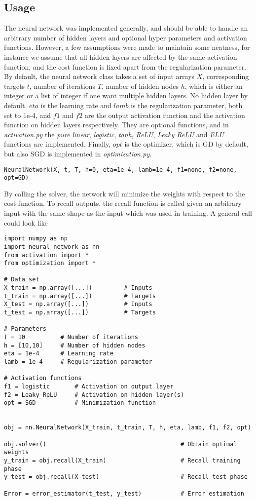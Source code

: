 \subsection{Usage}
The neural network was implemented generally, and should be able to handle an arbitrary number of hidden layers and optional hyper parameters and activation functions. However, a few assumptions were made to maintain some neatness, for instance we assume that all hidden layers are affected by the same activation function, and the cost function is fixed apart from the regularization parameter. By default, the neural network class takes a set of input arrays $X$, corresponding targets $t$, number of iterations $T$, number of hidden nodes $h$, which is either an integer or a list of integer if one want multiple hidden layers. No hidden layer by default. $eta$ is the learning rate and $lamb$ is the regularization parameter, both set to 1e-4, and $f1$ and $f2$ are the output activation function and the activation function on hidden layers respectively. They are optional functions, and in \textit{activation.py} the \textit{pure linear}, \textit{logistic}, \textit{tanh}, \textit{ReLU}, \textit{Leaky ReLU} and \textit{ELU} functions are implemented. Finally, $opt$ is the optimizer, which is GD by default, but also SGD is implemented in \textit{optimization.py}.

\lstset{basicstyle=\scriptsize}
\begin{lstlisting}
NeuralNetwork(X, t, T, h=0, eta=1e-4, lamb=1e-4, f1=none, f2=none, opt=GD)
\end{lstlisting}
By calling the solver, the network will minimize the weights with respect to the cost function. To recall outputs, the recall function is called given an arbitrary input with the same shape as the input which was used in training. A general call could look like

\lstset{basicstyle=\scriptsize}
\begin{lstlisting}
import numpy as np
import neural_network as nn
from activation import *
from optimization import *

# Data set
X_train = np.array([...])         # Inputs
t_train = np.array([...])         # Targets
X_test = np.array([...])          # Inputs
t_test = np.array([...])          # Targets

# Parameters
T = 10          # Number of iterations
h = [10,10]     # Number of hidden nodes
eta = 1e-4      # Learning rate
lamb = 1e-4     # Regularization parameter

# Activation functions
f1 = logistic       # Activation on output layer
f2 = Leaky_ReLU	    # Activation on hidden layer(s)
opt = SGD           # Minimization function


obj = nn.NeuralNetwork(X_train, t_train, T, h, eta, lamb, f1, f2, opt)

obj.solver()                                      # Obtain optimal weights
y_train = obj.recall(X_train)                     # Recall training phase
y_test = obj.recall(X_test)                       # Recall test phase

Error = error_estimator(t_test, y_test)           # Error estimation
\end{lstlisting}

